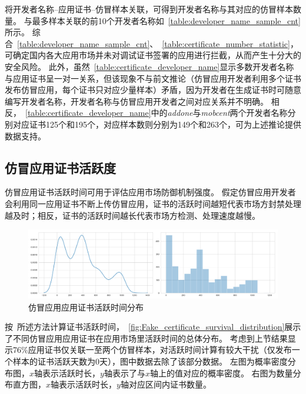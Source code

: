 将开发者名称--应用证书--仿冒样本关联，可得到开发者名称与其对应的仿冒样本数量。
与最多样本关联的前10个开发者名称如~\autoref{table:developer_name_sample_cnt}所示。
综合~\autoref{table:developer_name_sample_cnt}、~\autoref{table:certificate_number_statistic}，可确定国内各大应用市场并未对调试证书签署的应用进行拦截，从而产生十分大的安全风险。
此外，虽然~\autoref{table:certificate_developer_name}显示多数开发者名称与应用证书呈一对一关系，但该现象不与前文推论（仿冒应用开发者利用多个证书发布仿冒应用，每个证书只对应少量样本）矛盾，因为开发者在生成证书时可随意编写开发者名称，开发者名称与仿冒应用开发者之间对应关系并不明确。
相反，~\autoref{table:certificate_developer_name}中的\emph{addone}与\emph{mobcent}两个开发者名称分别对应证书125个和195个，对应样本数则分别为149个和263个，可为上述推论提供数据支持。

\subsection{仿冒应用证书活跃度}


仿冒应用证书活跃时间可用于评估应用市场防御机制强度。
假定仿冒应用开发者会利用同一应用证书不断上传仿冒应用，证书的活跃时间越短代表市场方封禁处理越及时；相反，证书的活跃时间越长代表市场方检测、处理速度越慢。

\begin{figure}[htbp]
    \centering
    \includegraphics[width=\textwidth]{./Figures/edwin-Fake_certificate_survival_distribution3_new.png}
    \caption{仿冒应用应用证书活跃时间分布}
    \label{fig:Fake_certificate_survival_distribution}
\end{figure}

按~所述方法计算证书活跃时间，~\autoref{fig:Fake_certificate_survival_distribution}展示了不同仿冒应用应用证书在应用市场里活跃时间的总体分布。
考虑到上节结果显示76\%应用证书仅关联一至两个仿冒样本，对活跃时间计算有较大干扰（仅发布一个样本的证书活跃天数为0天），图中数据去除了该部分数据。
左图为概率密度分布图，$x$轴表示活跃时长，$y$轴表示了与$x$轴上的值对应的概率密度。
右图为数量分布直方图，$x$轴表示活跃时长，$y$轴对应区间内证书数量。

